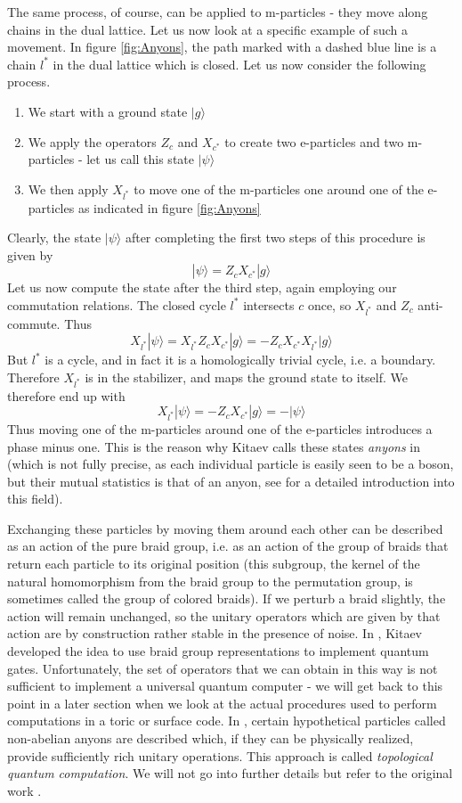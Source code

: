 \documentclass[a4paper, draft]{article}
\theoremstyle{own}
\theoremstyle{remark}
\begin{document}
The same process, of course, can be applied to m-particles - they move along chains in the dual lattice. Let us now look at a specific example of such a movement. In figure \ref{fig:Anyons}, the path marked with a dashed blue line is a chain $l^*$ in the dual lattice which is closed. Let us now consider the following process.
\begin{enumerate}
	\item We start with a ground state $|g \rangle$
	\item We apply the operators $Z_c$ and $X_{c^*}$ to create two e-particles and two m-particles - let us call this state $|\psi \rangle$
	\item We then apply $X_{l^*}$ to move one of the m-particles one around one of the e-particles as indicated in figure \ref{fig:Anyons}
\end{enumerate}
Clearly, the state $|\psi \rangle$ after completing the first two steps of this procedure is given by
$$
|\psi \rangle = Z_c X_{c^*}  |g \rangle
$$
Let us now compute the state after the third step, again employing our commutation relations. The closed cycle $l^*$ intersects $c$ once, so $X_{l^*}$ and $Z_c$ anti-commute. Thus
$$
X_{l^*} |\psi \rangle = X_{l^*}  Z_c X_{c^*} |g \rangle = -   Z_c X_{c^*} X_{l^*} |g \rangle
$$
But $l^*$ is a cycle, and in fact it is a homologically trivial cycle, i.e. a boundary. Therefore $X_{l^*}$ is in the stabilizer, and maps the ground state to itself. We therefore end up with
$$
X_{l^*} |\psi \rangle =  -   Z_c X_{c^*}  |g \rangle = - |\psi \rangle
$$
Thus moving one of the m-particles around one of the e-particles introduces a phase minus one. This is the reason why Kitaev calls these states \emph{anyons} in \cite{Kitaev} (which is not fully precise, as each individual particle is easily seen to be a boson, but their mutual statistics is that of an anyon, see \cite{Rao} for a detailed introduction into this field).

Exchanging these particles by moving them around each other can be described as an action of the pure braid group, i.e. as an action of the group of braids that return each particle to its original position (this subgroup, the kernel of the natural homomorphism from the braid group to the permutation group, is sometimes called the group of colored braids). If we perturb a braid slightly, the action will remain unchanged, so the unitary operators which are given by that action are by construction rather stable in the presence of noise. In \cite{Kitaev}, Kitaev developed the idea to use braid group representations to implement quantum gates. Unfortunately, the set of operators that we can obtain in this way is not sufficient to implement a universal quantum computer - we will get back to this point in a later section when we look at the actual procedures used to perform computations in a toric or surface code. In \cite{Kitaev}, certain hypothetical particles called non-abelian anyons are described which, if they can be physically realized, provide sufficiently rich unitary operations. This approach is called \emph{topological quantum computation}. We will not go into further details but refer to the original work \cite{Kitaev}. 
\end{document}

